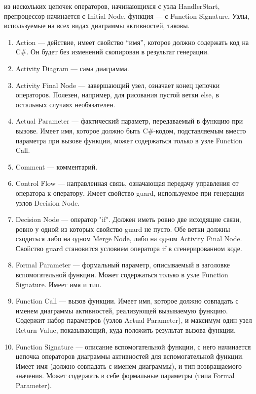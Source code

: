 \begin{enumerate}
		из нескольких цепочек операторов, начинающихся с узла HandlerStart, препроцессор 
		начинается с Initial Node, функция --- с Function Signature. Узлы, используемые 
		на всех видах диаграммы активностей, таковы.
		\begin{enumerate}
			\item Action --- действие, имеет свойство "`имя"', которое должно содержать код 
				на C\#. Он будет без изменений скопирован в результат генерации.
			\item Activity Diagram --- сама диаграмма.
			\item Activity Final Node --- завершающий узел, означает конец цепочки операторов. 
				Полезен, например, для рисования пустой ветки else, в остальных случаях необязателен.
			\item Actual Parameter --- фактический параметр, передаваемый в функцию при вызове. 
				Имеет имя, которое должно быть C\#-кодом, подставляемым вместо параметра при 
				вызове функции, может содержаться только в узле Function Call.
			\item Comment --- комментарий.
			\item Control Flow --- направленная связь, означающая передачу управления от 
				оператора к оператору. Имеет свойство guard, используемое при генерации узлов 
				Decision Node.
			\item Decision Node --- оператор "if". Должен иметь ровно две исходящие связи, 
				ровно у одной из которых свойство guard не пусто. Обе ветки должны сходиться 
				либо на одном Merge Node, либо на одном Activity Final Node. Свойство guard 
				становится условием оператора if в сгенерированном коде.
			\item Formal Parameter --- формальный параметр, описываемый в заголовке вспомогательной 
				функции. Может содержаться только в узле Function Signature. Имеет имя и тип.
			\item Function Call --- вызов функции. Имеет имя, которое должно совпадать с 
				именем диаграммы активностей, реализующей вызываемую функцию. Содержит набор 
				параметров (узлов Actual Parameter), и максимум один узел Return Value, показывающий, 
				куда положить результат вызова функции.
			\item Function Signature --- описание вспомогательной функции, с него начинается 
				цепочка операторов диаграммы активностей для вспомогательной функции. Имеет имя 
				(должно совпадать с именем диаграммы), и тип возвращаемого значения. Может 
				содержать в себе формальные параметры (типа Formal Parameter).

\end{enumerate}
\end{enumerate}
